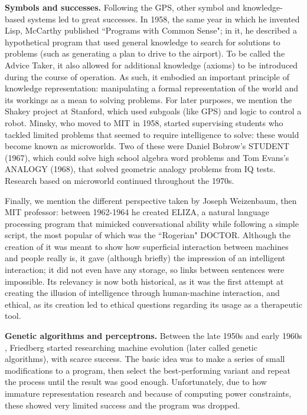 \documentclass[../main.tex]{subfiles}
\begin{document}
\vspace{4pt}
\textbf{Symbols and successes.}
Following the GPS, other symbol and knowledge-based systems led to great successes. In 1958, the same year in which he invented Lisp, McCarthy published ``Programs with Common Sense"\cite{mccarthyProgramsCommonSense1960}; in it, he described a hypothetical program that used general knowledge to search for solutions to problems (such as generating a plan to drive to the airport). To be called the Advice Taker, it also allowed for additional knowledge (axioms) to be introduced during the course of operation. As such, it embodied an important principle of knowledge representation: manipulating a formal representation of the world and its workings as a mean to solving problems.
For later purposes, we mention the Shakey project at Stanford, which used subgoals (like GPS) and logic to control a robot. Minsky, who moved to MIT in 1958, started supervising students who tackled limited problems that seemed to require intelligence to solve: these would become known as microworlds. Two of these were Daniel Bobrow's STUDENT (1967), which could solve high school algebra word problems and Tom Evans's ANALOGY (1968), that solved geometric analogy problems from IQ tests. Research based on microworld continued throughout the 1970s.

Finally, we mention the different perspective taken by Joseph Weizenbaum, then MIT professor: between 1962-1964 he created ELIZA, a natural language processing program that mimicked conversational ability while following a simple script, the most popular of which was the ``Rogerian" DOCTOR. Although the creation of it was meant to show how superficial interaction between machines and people really is, it gave (although briefly) the impression of an intelligent interaction; it did not even have any storage, so links between sentences were impossible. Its relevancy is now both historical, as it was the first attempt at creating the illusion of intelligence through human-machine interaction, and ethical, as its creation led to ethical questions regarding its usage as a therapeutic tool.

\vspace{4pt}
\textbf{Genetic algorithms and perceptrons.}
Between the late 1950s and early 1960s \cite{friedbergLearningMachinePart1958}, Friedberg started researching machine evolution (later called genetic algorithms), with scarce success. The basic idea was to make a series of small modifications to a program, then select the best-performing variant and repeat the process until the result was good enough. Unfortunately, due to how immature representation research and because of computing power constraints, these showed very limited success and the program was dropped.
\end{document}
